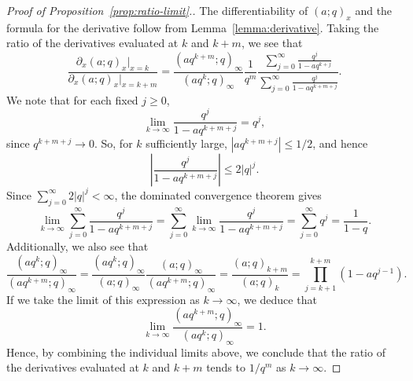\documentclass[11pt]{article}
\begin{document}
\begin{proof}[Proof of Proposition~\ref{prop:ratio-limit}.]
The differentiability of $(a; q)_x$ and the formula for the derivative follow from Lemma~\ref{lemma:derivative}.
Taking the ratio of the derivatives evaluated at $k$ and $k + m$, we see that 
\[
    \frac{\partial_x (a; q)_x |_{x = k}}{\partial_x (a; q)_x |_{x = k+m}} =  \frac{(aq^{k+m};q)_\infty}{(aq^k;q)_\infty} \frac{1}{q^m} \frac{\sum_{j=0}^\infty \frac{q^j}{1-aq^{k+j}}}{\sum_{j=0}^\infty \frac{q^j}{1-aq^{k+m+j}}}.
\]
We note that for each fixed $j \ge 0$,
\[
    \lim_{k\to\infty}\frac{q^j}{1-aq^{k+m+j}}=q^j,
\]
since $q^{k+m+j} \to 0$. So, for $k$ sufficiently large, $|a q^{k+m+j}| \le 1/2$, and hence
\[
    \left| \frac{q^j}{1-aq^{k+m+j}}\right| \le 2|q|^j.
\]
Since $\sum_{j=0}^{\infty}2|q|^j < \infty$, the dominated convergence theorem gives
\[
    \lim_{k\to\infty}\sum_{j=0}^{\infty} \frac{q^j}{1-aq^{k+m+j}}
    = \sum_{j=0}^{\infty} \lim_{k\to\infty} \frac{q^j}{1-aq^{k+m+j}}
    = \sum_{j=0}^{\infty}q^j
    = \frac{1}{1-q}.
\]
Additionally, we also see that 
\[
    \frac{(aq^k;q)_\infty}{(aq^{k+m};q)_\infty}
    = \frac{(aq^k;q)_\infty}{(a;q)_\infty} \frac{(a;q)_\infty}{(aq^{k+m};q)_\infty}
    = \frac{(a;q)_{k+m}}{(a;q)_{k}}
    = \prod_{j=k+1}^{k+m}(1-aq^{j-1}).
\]
If we take the limit of this expression as $k \to \infty$, we deduce that
\[
    \lim_{k \to \infty} \frac{(aq^{k+m};q)_\infty}{(aq^k;q)_\infty} = 1.
\]
Hence, by combining the individual limits above, we conclude that the ratio of the derivatives evaluated at $k$ and $k + m$ tends to $1 / q^m$ as $k \to \infty$.
\end{proof}
\end{document}
